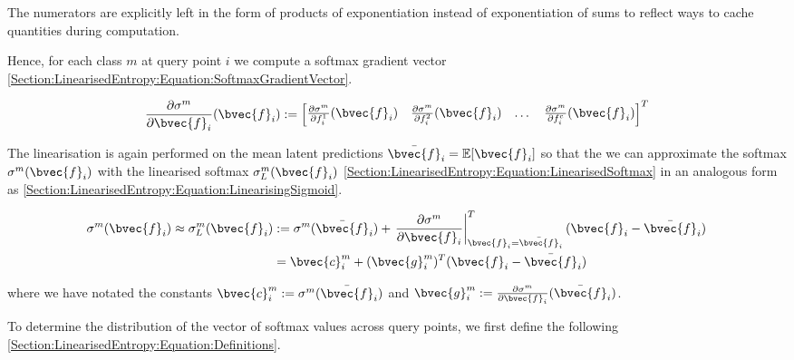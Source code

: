 \documentclass{article}
\begin{document}
			The numerators are explicitly left in the form of products of exponentiation instead of exponentiation of sums to reflect ways to cache quantities during computation. 
			
			Hence, for each class $m$ at query point $i$ we compute a softmax gradient vector \eqref{Section:LinearisedEntropy:Equation:SoftmaxGradientVector}.
			
			\begin{equation}
				\frac{\partial \sigma^{m}}{\partial \bvec{f}_{i}}(\bvec{f}_{i}) := \begin{bmatrix} \frac{\partial \sigma^{m}}{\partial f^{1}_{i}}(\bvec{f}_{i}) & \frac{\partial \sigma^{m}}{\partial f^{2}_{i}}(\bvec{f}_{i}) & \dots & \frac{\partial \sigma^{m}}{\partial f^{c}_{i}}(\bvec{f}_{i}) \end{bmatrix}^{T}
			\label{Section:LinearisedEntropy:Equation:SoftmaxGradientVector}
			\end{equation}
			
			The linearisation is again performed on the mean latent predictions $\bar{\bvec{f}}_{i} = \mathbb{E}[\bvec{f}_{i}]$ so that the we can approximate the softmax $\sigma^{m}(\bvec{f}_{i})$ with the linearised softmax $\sigma^{m}_{L}(\bvec{f}_{i})$ \eqref{Section:LinearisedEntropy:Equation:LinearisedSoftmax} in an analogous form as \eqref{Section:LinearisedEntropy:Equation:LinearisingSigmoid}.
			
			\begin{equation}
				\begin{aligned}
					\sigma^{m}(\bvec{f}_{i}) \approx \sigma^{m}_{L}(\bvec{f}_{i}) & := \sigma^{m}(\bar{\bvec{f}}_{i}) + \left. \frac{\partial \sigma^{m}}{\partial \bvec{f}_{i}} \right|^{T}_{\bvec{f}_{i} = \bar{\bvec{f}}_{i}} (\bvec{f}_{i} - \bar{\bvec{f}}_{i}) \\
					& = \bvec{c}^{m}_{i} + (\bvec{g}^{m}_{i})^{T} (\bvec{f}_{i} - \bar{\bvec{f}}_{i})
				\end{aligned}
			\label{Section:LinearisedEntropy:Equation:LinearisedSoftmax}
			\end{equation}
			
			where we have notated the constants $\bvec{c}^{m}_{i} := \sigma^{m}(\bar{\bvec{f}}_{i})$ and $\bvec{g}^{m}_{i} := \frac{\partial \sigma^{m}}{\partial \bvec{f}_{i}}(\bar{\bvec{f}}_{i})$.
			
			To determine the distribution of the vector of softmax values across query points, we first define the following \eqref{Section:LinearisedEntropy:Equation:Definitions}.
			
\end{document}
